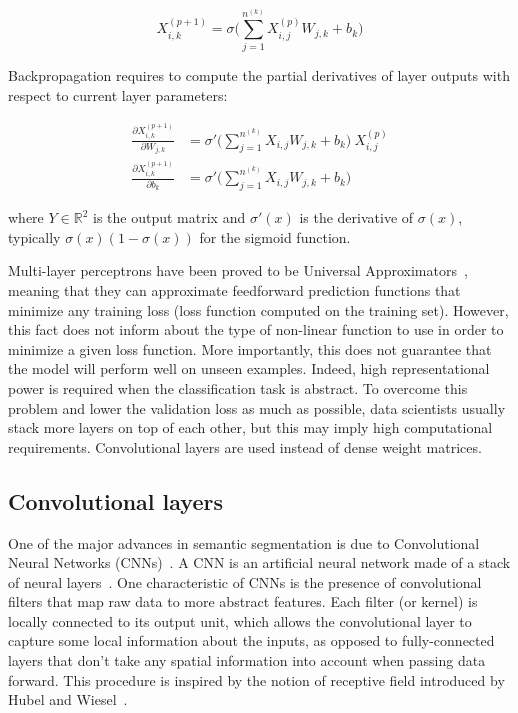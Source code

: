         \begin{equation}
            X_{i, k}^{(p+1)} = \sigma \Big( \sum\limits_{j=1}^{n^{(k)}} X^{(p)}_{i, j} W_{j, k} + b_{k} \Big)
        \end{equation}

        Backpropagation requires to compute the partial derivatives of layer outputs with respect to current layer parameters:

        \begin{align}
            \frac{\partial X_{i, k}^{(p+1)}}{\partial W_{j, k}} & = \sigma' \Big( \sum\limits_{j=1}^{n^{(k)}} X_{i, j} W_{j, k} + b_{k} \Big) \ X_{i, j}^{(p)} \\
            \frac{\partial X_{i, k}^{(p+1)}}{\partial b_{k}} & = \sigma' \Big( \sum\limits_{j=1}^{n^{(k)}} X_{i, j} W_{j, k} + b_{k} \Big)
        \end{align}

        where $Y \in \mathbb{R}^2$ is the output matrix and $\sigma'(x)$ is the derivative of $\sigma(x)$,
        typically $\sigma(x) (1 - \sigma(x))$ for the sigmoid function.

        Multi-layer perceptrons have been proved to be Universal Approximators~\cite{hornik1991approximation},
        meaning that they can approximate feedforward prediction functions that minimize any training loss (loss function computed on the training set).
        However, this fact does not inform about the type of non-linear function to use in order to minimize
        a given loss function. More importantly, this does not guarantee that the model will perform well on unseen examples.
        Indeed, high representational power is required when the classification task is abstract.
        To overcome this problem and lower the validation loss as much as possible, data scientists usually stack more layers on top of each other,
        but this may imply high computational requirements. Convolutional layers are used instead of dense weight matrices.

    \subsection{Convolutional layers} \label{convlayers}

        One of the major advances in semantic segmentation
        is due to Convolutional Neural Networks (CNNs)~\cite{DBLP:journals/corr/Garcia-GarciaOO17}.
        A CNN is an artificial neural network made of a stack of neural layers~\cite{lecun1998gradient}. One characteristic of CNNs is the
        presence of convolutional filters that map raw data to more abstract features. Each filter (or kernel) is locally connected to its output unit, which
        allows the convolutional layer to capture some local information about the inputs, as opposed to fully-connected layers that don't take any spatial
        information into account when passing data forward. This procedure is inspired by the notion of receptive field introduced 
        by Hubel and Wiesel~\cite{Hubel1962}.

